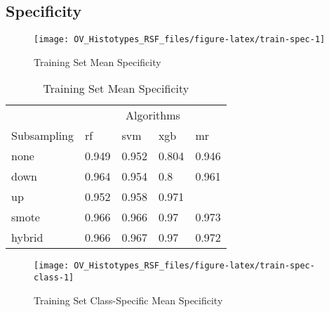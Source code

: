 \documentclass[
]{report}
\begin{document}
\subsection{Specificity}\label{specificity-1}

\begin{figure}[H]

{\centering \texttt{[image: OV\_Histotypes\_RSF\_files/figure-latex/train-spec-1]} 

}

\caption{Training Set Mean Specificity}\label{fig:train-spec}
\end{figure}

\begin{table}

\caption{\label{tab:train-spec-table}Training Set Mean Specificity}
\centering
\begin{tabular}[t]{l|l|l|l|l}
\hline
\multicolumn{1}{c|}{ } & \multicolumn{4}{c}{Algorithms} \\
\cline{2-5}
Subsampling & rf & svm & xgb & mr\\
\hline
none & 0.949 & 0.952 & 0.804 & 0.946\\
\hline
down & 0.964 & 0.954 & 0.8 & 0.961\\
\hline
up & 0.952 & 0.958 & 0.971 & \cellcolor[HTML]{90ee90}{0.974}\\
\hline
smote & 0.966 & 0.966 & 0.97 & 0.973\\
\hline
hybrid & 0.966 & 0.967 & 0.97 & 0.972\\
\hline
\end{tabular}
\end{table}

\begin{figure}[H]

{\centering \texttt{[image: OV\_Histotypes\_RSF\_files/figure-latex/train-spec-class-1]} 

}

\caption{Training Set Class-Specific Mean Specificity}\label{fig:train-spec-class}
\end{figure}
\end{document}
